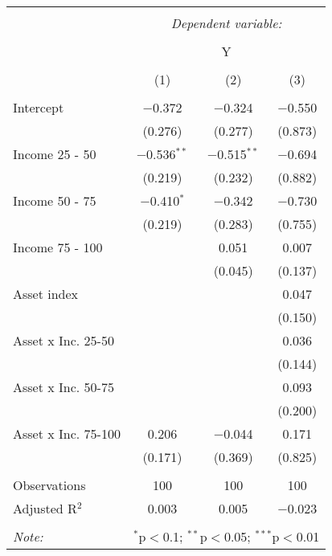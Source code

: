 
\begin{tabular}{@{\extracolsep{5pt}}lccc} 
\\[-1.8ex]\hline 
\hline \\[-1.8ex] 
 & \multicolumn{3}{c}{\textit{Dependent variable:}} \\ 
\cline{2-4} 
\\[-1.8ex] & \multicolumn{3}{c}{Y} \\ 
\\[-1.8ex] & (1) & (2) & (3)\\ 
\hline \\[-1.8ex] 
 Intercept & $-$0.372 & $-$0.324 & $-$0.550 \\ 
  & (0.276) & (0.277) & (0.873) \\ 
  Income 25 - 50 & $-$0.536$^{**}$ & $-$0.515$^{**}$ & $-$0.694 \\ 
  & (0.219) & (0.232) & (0.882) \\ 
  Income 50 - 75 & $-$0.410$^{*}$ & $-$0.342 & $-$0.730 \\ 
  & (0.219) & (0.283) & (0.755) \\ 
  Income 75 - 100 &  & 0.051 & 0.007 \\ 
  &  & (0.045) & (0.137) \\ 
  Asset index &  &  & 0.047 \\ 
  &  &  & (0.150) \\ 
  Asset x Inc. 25-50 &  &  & 0.036 \\ 
  &  &  & (0.144) \\ 
  Asset x Inc. 50-75 &  &  & 0.093 \\ 
  &  &  & (0.200) \\ 
  Asset x Inc. 75-100 & 0.206 & $-$0.044 & 0.171 \\ 
  & (0.171) & (0.369) & (0.825) \\ 
 \hline \\[-1.8ex] 
Observations & 100 & 100 & 100 \\ 
Adjusted R$^{2}$ & 0.003 & 0.005 & $-$0.023 \\ 
\hline 
\hline \\[-1.8ex] 
\textit{Note:}  & \multicolumn{3}{r}{$^{*}$p$<$0.1; $^{**}$p$<$0.05; $^{***}$p$<$0.01} \\ 
\end{tabular} 
